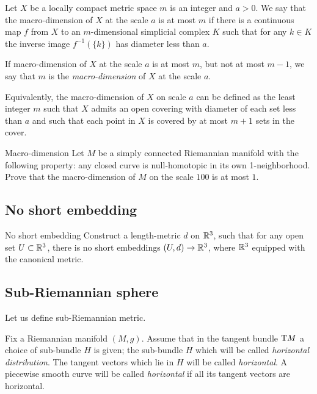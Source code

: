 Let $X$ be a locally compact metric space  $m$ is an integer
and $a>0$.
We say that the macro-dimension  of $X$ at the scale $a$ is at most $m$
if there is a continuous map $f$ from $X$ to an $m$-dimensional simplicial complex $K$
such that for any $k\in K$ the inverse image $f^{-1}(\{k\})$ has diameter less than $a$.

If macro-dimension of $X$ at the scale $a$ is at most $m$,
but not at most $m-1$, 
we say that $m$ is the \emph{macro-dimension} of $X$ at the scale $a$.

Equivalently, the macro-dimension of $X$ on scale $a$ can be defined as 
the least integer $m$ such that $X$ admits an open covering with diameter of each set less than $a$ 
and such that each point in $X$ is covered by at most $m+1$ sets in the cover.

\begin{pr}{\easy}{Macro-dimension}\label{macro-dimension} 
Let $M$ be a simply connected Riemannian manifold with the following property: 
any closed curve is null-homotopic 
in its own  1-neighborhood. 
Prove that the macro-dimension of $M$ on the scale $100$ is at most $1$.
\end{pr}

\subsection*{No short embedding\hard}

\begin{pr}{\hard}{No short embedding}\label{weird-metric} 
Construct a length-metric $d$ on $\mathbb{R}^3$,
such that for any open set $U\subset  \mathbb{R}^3$,
there is no short embeddings $(U,d)\to \mathbb{R}^3$,
where $\mathbb{R}^3$ equipped with the canonical metric.
\end{pr}

\subsection*{Sub-Riemannian sphere\thm}

Let us define sub-Riemannian metric.

Fix a Riemannian manifold $(M,g)$.
Assume that in the tangent bundle $\mathrm{T} M$ 
a choice of sub-bundle $H$ is given;
the sub-bundle $H$ which will be called  \emph{horizontal distribution}.
The tangent vectors which lie in $H$ will be called {}\emph{horizontal}.
A piecewise smooth curve will be called {}\emph{horizontal}
if all its tangent vectors are horizontal.

